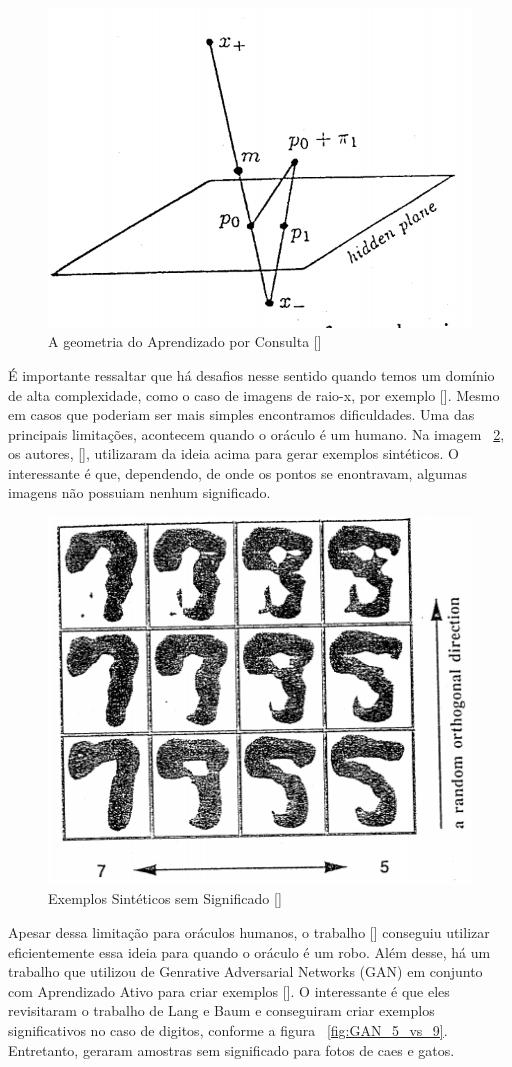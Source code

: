 \begin{figure}
  \centering
  \includegraphics[width=.4\textwidth]{figures/lang_baum_geometry_query_learning.png}
  \caption{A geometria do Aprendizado por Consulta [\cite{baum1992query}]}
  \label{fig:LangBaum_GeometryQueryLearning}
\end{figure}

É importante ressaltar que há desafios nesse sentido quando temos um domínio de alta complexidade, como o caso de imagens de raio-x, por exemplo [\cite{angluin1988queries}]. Mesmo em casos que poderiam ser mais simples encontramos dificuldades. Uma das principais limitações, acontecem quando o oráculo é um humano. Na imagem ~\ref{fig:LangBaum_5vs9Example}, os autores, [\cite{baum1992query}], utilizaram da ideia acima para gerar exemplos sintéticos. O interessante é que, dependendo, de onde os pontos se enontravam, algumas imagens não possuiam nenhum significado. 

\begin{figure}
  \centering
  \includegraphics[width=.4\textwidth]{figures/lang_baum_5_vs_9_example.png}
  \caption{Exemplos Sintéticos sem Significado [\cite{baum1992query}]}
  \label{fig:LangBaum_5vs9Example}
\end{figure}

Apesar dessa limitação para oráculos humanos, o trabalho [\cite{king2004functional, king2009automation}] conseguiu utilizar eficientemente essa ideia para quando o oráculo é um robo. Além desse, há um trabalho que utilizou de Genrative Adversarial Networks (GAN) em conjunto com Aprendizado Ativo para criar exemplos [\cite{zhu2017generative}]. O interessante é que eles revisitaram o trabalho de Lang e Baum e conseguiram criar exemplos significativos no caso de digitos, conforme a figura ~\ref{fig:GAN_5_vs_9}. Entretanto, geraram amostras sem significado para fotos de caes e gatos. 

